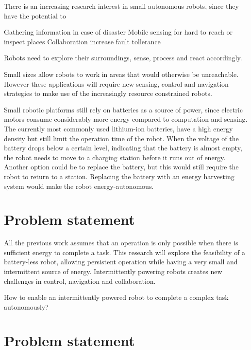 There is an increasing research interest in small autonomous robots, since they have the potential to 



Gathering information in case of disaster
Mobile sensing for hard to reach or inspect places
Collaboration increase fault tollerance


Robots need to explore their surroundings, sense, process and react accordingly.	


Small sizes allow robots to work in areas that would otherwise be unreachable. 
However these applications will require new sensing, control and navigation strategies to make use of the increasingly resource constrained robots.

Small robotic platforms still rely on batteries as a source of power, since electric motors consume considerably more energy compared to computation and sensing.
The currently most commonly used lithium-ion batteries, have a high energy density but still limit the operation time of the robot.
When the voltage of the battery drops below a certain level, indicating that the battery is almost empty, the robot needs to move to a charging station before it runs out of energy.
Another option could be to replace the battery, but this would still require the robot to return to a station.
Replacing the battery with an energy harvesting system would make the robot energy-autonomous. 


\section{Problem statement}

All the previous work assumes that an operation is only possible when there is sufficient energy to complete a task.
This research will explore the feasibility of a battery-less robot, allowing persistent operation while having a very small and intermittent source of energy.
Intermittently powering robots creates new challenges in control, navigation and collaboration.


How to enable an intermittently powered robot to complete a complex task autonomously?

\section{Problem statement}

